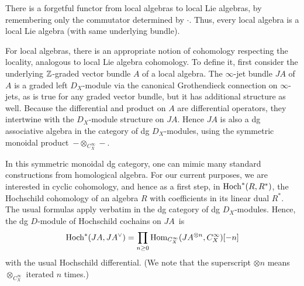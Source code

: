 There is a forgetful functor from local algebras to local Lie algebras, by remembering only the commutator determined by $\cdot$. 
Thus, every local algebra is a local Lie algebra (with same underlying bundle). 

%
%

For local algebras, there is an appropriate notion of cohomology respecting the locality, 
analogous to local Lie algebra cohomology. 
To define it, first consider the underlying $\mathbb Z$-graded vector bundle $A$ of a local algebra. 
The $\infty$-jet bundle $JA$ of $A$ is a graded left $D_X$-module via the canonical Grothendieck connection on $\infty$-jets,
as is true for any graded vector bundle,
but it has additional structure as well.
Because the differential and product on $A$ are differential operators, 
they intertwine with the $D_X$-module structure on $JA$.
Hence $JA$ is also a dg associative algebra in the category of dg $D_X$-modules,
using the symmetric monoidal product~$- \otimes_{C^\infty_X} -$. 



In this symmetric monoidal dg category, 
one can mimic many standard constructions from homological algebra.
For our current purposes, we are interested in cyclic cohomology,
and hence as a first step, in ${\rm Hoch}^*(R,R^*)$, the Hochschild cohomology of an algebra $R$ with coefficients in its linear dual $R^*$.
The usual formulas apply verbatim in the dg category of dg $D_X$-modules.
Hence, the dg $D$-module of Hochschild cochains on $JA$~is 
\[
{\rm Hoch}^* (JA, JA^\vee) = \prod_{n \geq 0} {\rm Hom}_{C^\infty_X} (JA^{\otimes n}, C^\infty_X)[-n]
\]
with the usual Hochschild differential.
(We note that the superscript $\otimes n$ means $\otimes_{C^\infty_X}$ iterated $n$ times.)

